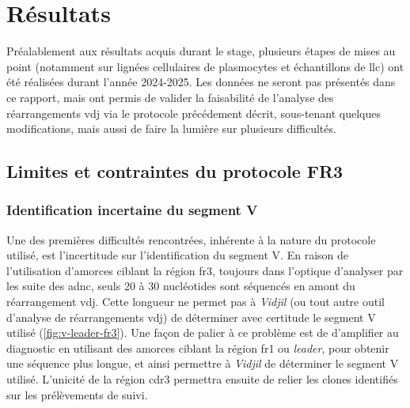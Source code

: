 \chapter{Résultats}

Préalablement aux résultats acquis durant le stage, plusieurs étapes de mises au point (notamment sur lignées cellulaires de plasmocytes et 
échantillons de \gls{llc}) ont été réalisées durant l'année 2024-2025. Les données ne seront pas présentés dans ce rapport, mais ont permis 
de valider la faisabilité de l'analyse des réarrangements \gls{vdj} via le protocole précédement décrit, sous-tenant quelques modifications, 
mais aussi de faire la lumière sur plusieurs difficultés.

\section{Limites et contraintes du protocole FR3}

\subsection{Identification incertaine du segment V}

Une des premières difficultés rencontrées, inhérente à la nature du protocole utilisé, est l'incertitude sur l'identification 
du segment V. En raison de l'utilisation d'amorces ciblant la région \gls{fr}3, toujours dans l'optique d'analyser par les suite 
des \gls{adnc}, seuls 20 à 30 nucléotides sont séquencés en amont du réarrangement \gls{vdj}. Cette longueur ne permet pas à 
\textit{Vidjil} (ou tout autre outil d'analyse de réarrangements \gls{vdj}) de déterminer avec certitude le segment V utilisé 
(\autoref{fig:v-leader-fr3}). 
Une façon de palier à ce problème est de d'amplifier au diagnostic en utilisant des amorces ciblant la région \gls{fr}1 ou 
\textit{leader}, pour obtenir une séquence plus longue, et ainsi permettre à \textit{Vidjil} de déterminer le segment V utilisé. 
L'unicité de la région \gls{cdr}3 permettra ensuite de relier les clones identifiés sur les prélèvements de suivi.

